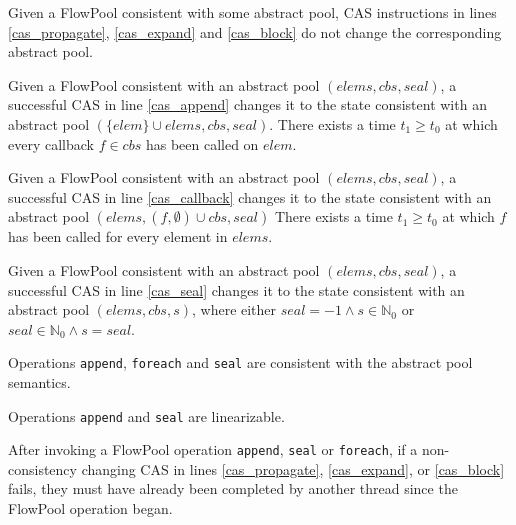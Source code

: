 \begin{lemma}
Given a FlowPool consistent with some abstract
pool, CAS instructions in lines \ref{cas_propagate}, \ref{cas_expand} and
\ref{cas_block} do not change the corresponding abstract pool.
\end{lemma}

\begin{lemma}
Given a FlowPool consistent with an abstract pool $(elems, cbs,
seal)$, a successful CAS in line \ref{cas_append}
changes it to the state consistent with an abstract pool
$(\{elem\} \cup elems, cbs, seal)$.
There exists a time $t_1 \geq t_0$ at which every callback $f \in
cbs$ has been called on $elem$.
\end{lemma}

\begin{lemma}
Given a FlowPool consistent with an abstract pool $(elems, cbs, seal)$,
a successful CAS in line \ref{cas_callback} changes it
to the state consistent with an abstract pool $(elems, (f, \emptyset)
\cup cbs, seal)$
There exists a time $t_1 \geq t_0$ at which $f$ has been called for
every element in $elems$.
\end{lemma}

\begin{lemma}
Given a FlowPool consistent with an abstract pool $(elems, cbs, seal)$,
a successful CAS in line \ref{cas_seal} changes it to the state
consistent with an abstract pool $(elems, cbs, s)$, where either $seal
= -1 \wedge s \in \mathbb{N}_0$ or $seal \in \mathbb{N}_0 \wedge s = seal$.
\end{lemma}

\begin{theorem}[Safety]
Operations \verb=append=, \verb=foreach=
and \verb=seal= are consistent with the abstract pool semantics.
\end{theorem}

\begin{theorem}[Linearizability]
Operations \verb=append= and \verb=seal= are linearizable.
\end{theorem}

\begin{lemma}
After invoking a FlowPool operation \verb=append=, \verb=seal= or
\verb=foreach=, if a non-consistency changing CAS in lines
\ref{cas_propagate}, \ref{cas_expand}, or \ref{cas_block} fails, they must have
already been completed by another thread since the FlowPool operation began.
\end{lemma}

